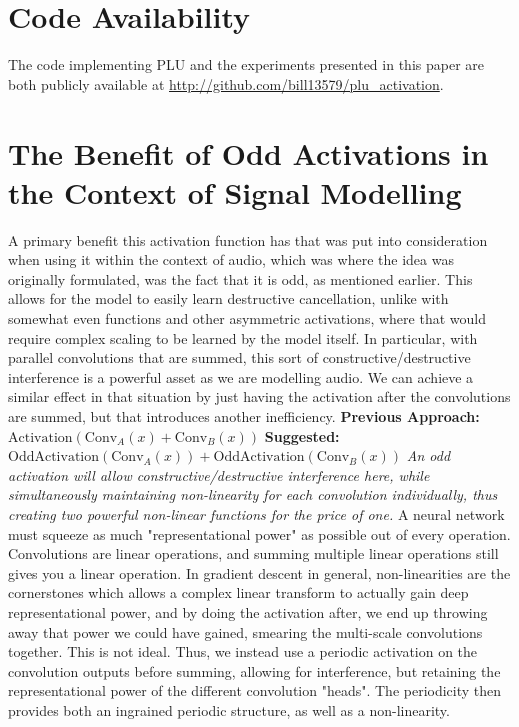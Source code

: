 \documentclass[11pt, letterpaper]{article}
\begin{document}
\section*{Code Availability}

The code implementing PLU and the experiments presented in this paper are both publicly available at \url{http://github.com/bill13579/plu_activation}.




\appendix
\section{The Benefit of Odd Activations in the Context of Signal Modelling}

A primary benefit this activation function has that was put into consideration when using it within the context of audio, which was where the idea was originally formulated, was the fact that it is odd, as mentioned earlier. This allows for the model to easily learn destructive cancellation, unlike with somewhat even functions and other asymmetric activations, where that would require complex scaling to be learned by the model itself. In particular, with parallel convolutions that are summed, this sort of constructive/destructive interference is a powerful asset as we are modelling audio. We can achieve a similar effect in that situation by just having the activation after the convolutions are summed, but that introduces another inefficiency.
\newline\newline
\textbf{Previous Approach:} $\text{Activation}(\text{Conv}_A(x) + \text{Conv}_B(x))$
\newline\newline
\textbf{Suggested:} $\text{OddActivation}(\text{Conv}_A(x)) + \text{OddActivation}(\text{Conv}_B(x))$
\newline\newline
\textit{An odd activation will allow constructive/destructive interference here, while simultaneously maintaining non-linearity for each convolution individually, thus creating two powerful non-linear functions for the price of one.}
\newline\newline
A neural network must squeeze as much "representational power" as possible out of every operation. Convolutions are linear operations, and summing multiple linear operations still gives you a linear operation. In gradient descent in general, non-linearities are the cornerstones which allows a complex linear transform to actually gain deep representational power, and by doing the activation after, we end up throwing away that power we could have gained, smearing the multi-scale convolutions together. This is not ideal. Thus, we instead use a periodic activation on the convolution outputs before summing, allowing for interference, but retaining the representational power of the different convolution "heads". The periodicity then provides both an ingrained periodic structure, as well as a non-linearity.
\end{document}
